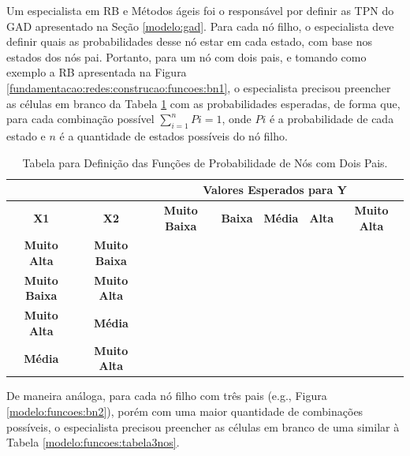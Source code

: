 Um especialista em RB e Métodos ágeis foi o responsável por definir as TPN do GAD apresentado na Seção \ref{modelo:gad}. Para cada nó filho, o especialista deve definir quais as probabilidades desse nó estar em cada estado, com base nos estados dos nós pai. Portanto, para um nó com dois pais, e tomando como exemplo a RB apresentada na Figura \ref{fundamentacao:redes:construcao:funcoes:bn1}, o especialista precisou preencher as células em branco da Tabela \ref{modelo:funcoes:tabela2nos} com as probabilidades esperadas, de forma que, para cada combinação possível $\sum_{i=1}^{n}Pi = 1$, onde $Pi$ é a probabilidade de cada estado e $n$ é a quantidade de estados possíveis do nó filho.

\begin{table}[ht!]
\centering
\caption{Tabela para Definição das Funções de Probabilidade de Nós com Dois Pais.}
\label{modelo:funcoes:tabela2nos}
\begin{tabular}{|c|c|c|c|c|c|c|}
\hline
\multicolumn{2}{|l|}{}                      & \multicolumn{5}{c|}{\textbf{Valores Esperados para Y}}                                       \\ \hline
\textbf{X1}          & \textbf{X2}          & \textbf{Muito Baixa} & \textbf{Baixa} & \textbf{Média} & \textbf{Alta} & \textbf{Muito Alta} \\ \hline
\textbf{Muito Alta}  & \textbf{Muito Baixa} &               &         &         &        &               \\ \hline
\textbf{Muito Baixa} & \textbf{Muito Alta}  &               &         &         &        &              \\ \hline
\textbf{Muito Alta}  & \textbf{Média}       &               &         &         &        &              \\ \hline
\textbf{Média}       & \textbf{Muito Alta}  &               &         &         &        &              \\ \hline
\end{tabular}
\end{table}

De maneira análoga, para cada nó filho com três pais (e.g., Figura \ref{modelo:funcoes:bn2}), porém com uma maior quantidade de combinações possíveis, o especialista precisou preencher as células em branco de uma similar à Tabela \ref{modelo:funcoes:tabela3nos}.


